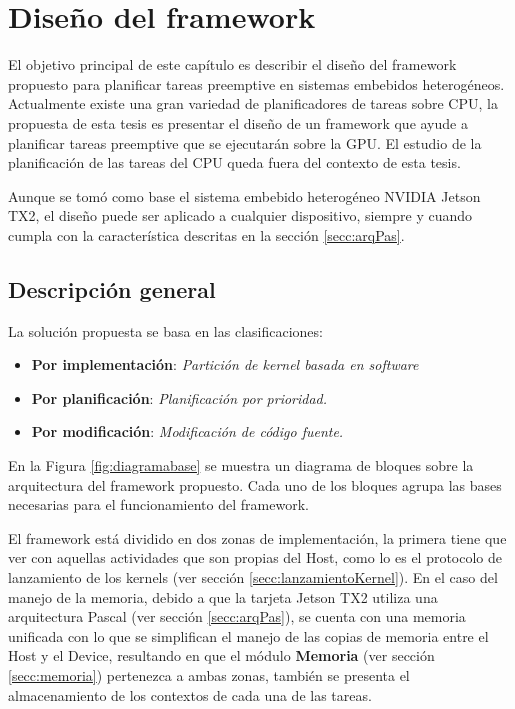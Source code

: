 

\chapter{Diseño del framework}\label{cha:Diseño}

El objetivo principal de este capítulo es describir el diseño del framework propuesto para planificar tareas preemptive en sistemas embebidos heterogéneos. Actualmente existe una gran variedad de planificadores de tareas sobre CPU, la propuesta de esta tesis es presentar el diseño de un framework que ayude a planificar tareas preemptive que se ejecutarán sobre la GPU. El estudio de la planificación de las tareas del CPU queda fuera del contexto de esta tesis.
\newline

Aunque se tomó como base el sistema embebido heterogéneo NVIDIA Jetson TX2, el diseño puede ser aplicado a cualquier dispositivo, siempre y cuando cumpla con la característica descritas en la sección \ref{secc:arqPas}.

\section{Descripción general}

La solución propuesta se basa en las clasificaciones:
\begin{itemize}
    \item \textbf{Por implementación}: \textit{Partición de kernel basada en software}
    \item \textbf{Por planificación}: \textit{Planificación por prioridad.}
    \item \textbf{Por modificación}: \textit{Modificación de código fuente.}
\end{itemize}

En la Figura \ref{fig:diagramabase} se muestra un diagrama de bloques sobre la arquitectura del framework propuesto. Cada uno de los bloques agrupa las bases necesarias para el funcionamiento del framework.
\newline

El framework está dividido en dos zonas de implementación, la primera tiene que ver con aquellas actividades que son propias del Host, como lo es el protocolo de lanzamiento de los kernels (ver sección \ref{secc:lanzamientoKernel}). En el caso del manejo de la memoria, debido a que la tarjeta Jetson TX2 utiliza una arquitectura Pascal (ver sección \ref{secc:arqPas}), se cuenta con una memoria unificada con lo que se simplifican el manejo de las copias de memoria entre el Host y el Device, resultando en que el módulo \textbf{Memoria} (ver sección \ref{secc:memoria}) pertenezca a ambas zonas, también se presenta el almacenamiento de los contextos de cada una de las tareas.

